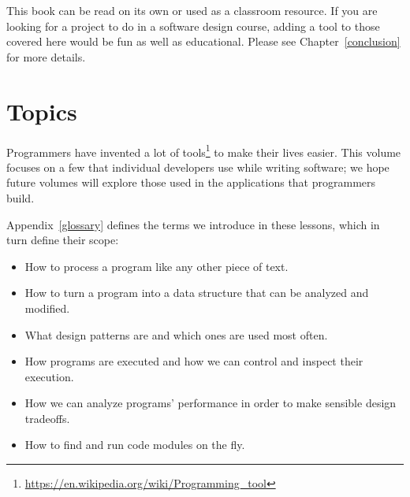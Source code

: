 \documentclass{scrbook}
\newcommand{\appref}[1]{Appendix~\ref{#1}}
\newcommand{\chapref}[1]{Chapter~\ref{#1}}
\newcommand{\hreffoot}[2]{{#1}\footnote{\href{#2}{#2}}}
\begin{document}
This book can be read on its own or used as a classroom resource.
If you are looking for a project to do in a software design course,
adding a tool to those covered here would be fun as well as educational.
Please see \chapref{conclusion} for more details.

\section{Topics}\label{introduction-contents}


Programmers have invented \hreffoot{a lot of tools}{https://en.wikipedia.org/wiki/Programming\_tool} to make their lives easier.
This volume focuses on a few that individual developers use while writing software;
we hope future volumes
will explore those used in the applications that programmers build.


\appref{glossary} defines the terms we introduce in these lessons,
which in turn define their scope:

\begin{itemize}

\item 

How to process a program like any other piece of text.



\item 

How to turn a program into a data structure that can be analyzed and modified.



\item 

What design patterns are and which ones are used most often.



\item 

How programs are executed and how we can control and inspect their execution.



\item 

How we can analyze programs' performance in order to make sensible design tradeoffs.



\item 

How to find and run code modules on the fly.



\end{itemize}
\end{document}
